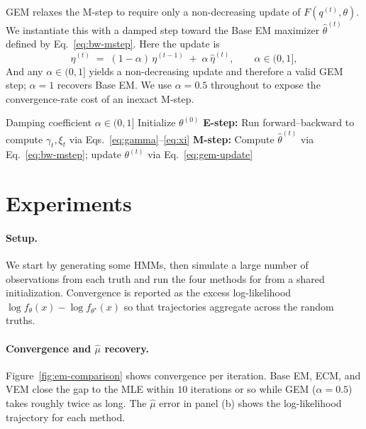 \documentclass{article}
\begin{document}
GEM relaxes the M-step to require only a non-decreasing update
of $F(q^{(t)}, \theta)$. We instantiate this
with a damped step toward the Base EM maximizer
$\hat\theta^{(t)}$ defined by Eq.~\eqref{eq:bw-mstep}.
Here the update is
\begin{equation}
  \eta^{(t)} \;=\; (1 - \alpha)\, \eta^{(t-1)} \;+\; \alpha\,
  \hat\eta^{(t)},
  \qquad \alpha \in (0, 1],
  \label{eq:gem-update}
\end{equation}
And any $\alpha \in (0, 1]$ yields a non-decreasing update
and therefore a valid GEM step; $\alpha = 1$
recovers Base EM. We use $\alpha = 0.5$ throughout to expose the
convergence-rate cost of an inexact M-step.

\begin{algorithm}[ht]
  \caption{Generalized EM with damped M-step}
  \begin{algorithmic}[1]
    \Require Damping coefficient $\alpha \in (0, 1]$
    \State Initialize $\theta^{(0)}$
    \Repeat
    \State \textbf{E-step:} Run forward--backward to compute
    $\gamma_t, \xi_t$ via Eqs.~\eqref{eq:gamma}--\eqref{eq:xi}
    \State \textbf{M-step:} Compute $\hat\theta^{(t)}$
    via Eq.~\eqref{eq:bw-mstep}; update $\theta^{(t)}$ via
    Eq.~\eqref{eq:gem-update}
  \end{algorithmic}
\end{algorithm}


\pagebreak

\section{Experiments}

\paragraph{Setup.} We start by generating some HMMs, then simulate a large number of observations from each truth and run the four
methods for from a shared initialization. Convergence
is reported as the excess log-likelihood
$\log f_\theta(x) - \log f_{\theta^\star}(x)$ so that trajectories
aggregate across the random truths.

\paragraph{Convergence and $\hat\mu$ recovery.}
Figure~\ref{fig:em-comparison} shows convergence per iteration. Base
EM, ECM, and VEM close the gap to the MLE within $10$
iterations or so while GEM ($\alpha = 0.5$) takes roughly twice as long. The $\hat\mu$ error in panel (b)
shows the log-likelihood trajectory for each method.
\end{document}
